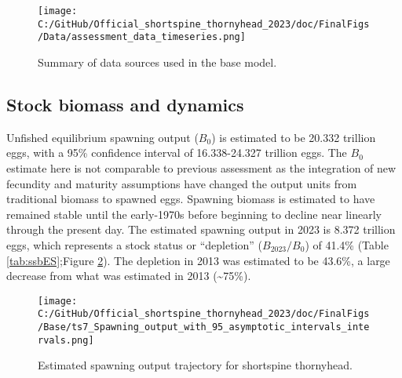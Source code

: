 \documentclass[11pt,
  english,
  letterpaper,
]{article}
\begin{document}
\begin{figure}
\centering
\texttt{[image: C:/GitHub/Official\_shortspine\_thornyhead\_2023/doc/FinalFigs/Data/assessment\_data\_timeseries.png]}
\caption{Summary of data sources used in the base model.\label{fig:assessment_data_timeseriesES}}
\end{figure}

\hypertarget{stock-biomass-and-dynamics}{%
\subsection*{Stock biomass and dynamics}\label{stock-biomass-and-dynamics}}

Unfished equilibrium spawning output (\(B_0\)) is estimated to be 20.332 trillion eggs, with a 95\% confidence interval of 16.338-24.327 trillion eggs. The \(B_0\) estimate here is not comparable to previous assessment as the integration of new fecundity and maturity assumptions have changed the output units from traditional biomass to spawned eggs. Spawning biomass is estimated to have remained stable until the early-1970s before beginning to decline near linearly through the present day. The estimated spawning output in 2023 is 8.372 trillion eggs, which represents a stock status or ``depletion'' (\(B_{2023}/B_0\)) of 41.4\% (Table \ref{tab:ssbES};Figure \ref{fig:ssb_trajectoryES}). The depletion in 2013 was estimated to be 43.6\%, a large decrease from what was estimated in 2013 (\textasciitilde75\%).

\begin{figure}
\centering
\texttt{[image: C:/GitHub/Official\_shortspine\_thornyhead\_2023/doc/FinalFigs/Base/ts7\_Spawning\_output\_with\_95\_asymptotic\_intervals\_intervals.png]}
\caption{Estimated spawning output trajectory for shortspine thornyhead.\label{fig:ssb_trajectoryES}}
\end{figure}

\begingroup\fontsize{10}{12}\selectfont
\begingroup\fontsize{10}{12}\selectfont
\end{document}
